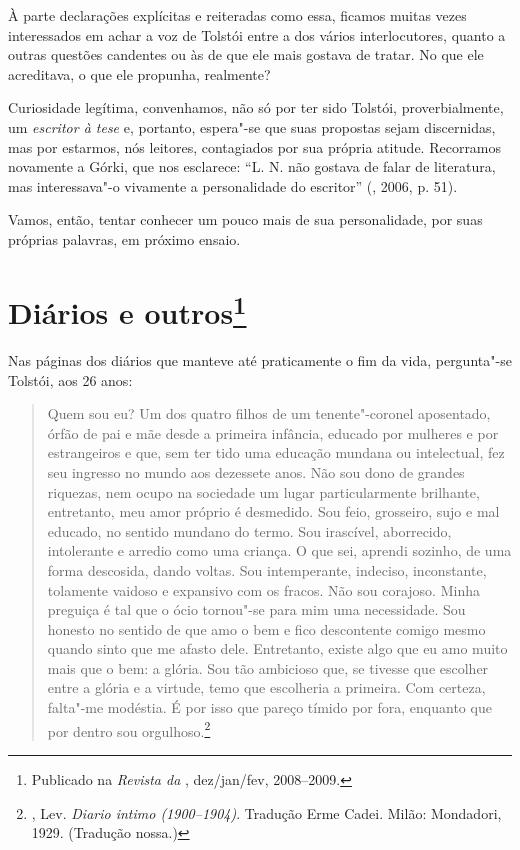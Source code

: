 À parte declarações explícitas e reiteradas como essa, ficamos muitas
vezes interessados em achar a voz de Tolstói entre a dos
vários interlocutores, quanto a outras questões candentes ou às de que
ele mais gostava de tratar. No que ele acreditava, o que ele propunha,
realmente?

Curiosidade legítima, convenhamos, não só por ter sido Tolstói,
proverbialmente, um \emph{escritor à tese} e, portanto, espera"-se que suas
propostas sejam discernidas, mas por estarmos, nós leitores,
contagiados por sua própria atitude. Recorramos novamente a
Górki, que nos esclarece: ``L. N. não gostava
de falar de literatura, mas interessava"-o vivamente a personalidade do
escritor'' (, 2006, p. 51).

Vamos, então, tentar conhecer um pouco mais de sua personalidade, por
suas próprias palavras, em próximo ensaio.

\chapter{Diários e outros\footnote{Publicado na \emph{Revista da \protect{}}, dez/jan/fev, 2008--2009.}}
\label{diarios}

Nas páginas dos diários que manteve até praticamente o fim da vida,
pergunta"-se Tolstói, aos 26 anos:

\begin{quotation}
Quem sou eu? Um dos quatro filhos de um
tenente"-coronel aposentado, órfão de pai e mãe desde a primeira
infância, educado por mulheres e por estrangeiros e que, sem ter tido
uma educação mundana ou intelectual, fez seu ingresso no mundo aos
dezessete anos. Não sou dono de grandes riquezas, nem ocupo na sociedade
um lugar particularmente brilhante, entretanto, meu amor próprio é
desmedido. Sou feio, grosseiro, sujo e mal educado, no sentido mundano
do termo. Sou irascível, aborrecido, intolerante e arredio como uma
criança. O que sei, aprendi sozinho, de uma forma descosida, dando
voltas. Sou intemperante, indeciso, inconstante, tolamente vaidoso e
expansivo com os fracos. Não sou corajoso. Minha preguiça é tal que o
ócio tornou"-se para mim uma necessidade. Sou honesto no sentido de que
amo o bem e fico descontente comigo mesmo quando sinto que me afasto
dele. Entretanto, existe algo que eu amo muito mais que o bem: a glória.
Sou tão ambicioso que, se tivesse que escolher entre a glória e a
virtude, temo que escolheria a primeira. Com certeza, falta"-me modéstia.
É por isso que pareço tímido por fora, enquanto que por dentro sou
orgulhoso.\footnote{, Lev. \emph{Diario intimo (1900--1904)}. Tradução Erme Cadei. Milão: Mondadori, 1929. (Tradução nossa.)}
\end{quotation}


